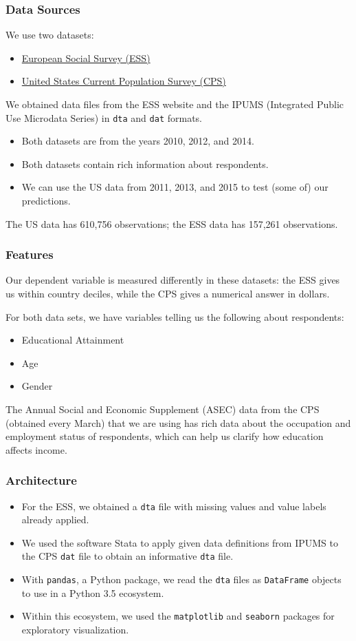 \documentclass{beamer}
\let\olditem=\item
\renewcommand{\item}{\olditem \justifying}
\begin{document}
\frame %
{
  \frametitle{Data Sources}
  We use two datasets:
  \begin{itemize} 
  \item \href{http://www.europeansocialsurvey.org/}{European Social Survey (ESS)} 
  \item \href{https://cps.ipums.org/cps/index.shtml}{United States Current Population Survey (CPS)}
  \end{itemize}
  We obtained data files from the ESS website and the IPUMS (Integrated Public Use Microdata Series) in \texttt{dta} and \texttt{dat} formats.
  \begin{itemize}
  \item Both datasets are from the years 2010, 2012, and 2014.
  \item Both datasets contain rich information about respondents.
  \item We can use the US data from 2011, 2013, and 2015 to test (some of) our predictions.
  \end{itemize}
  The US data has 610,756 observations; the ESS data has 157,261 observations.
}

\frame %
{
  \frametitle{Features}
Our dependent variable is measured differently in these datasets: the ESS gives us within country deciles, while the CPS gives a numerical answer in dollars.

For both data sets, we have variables telling us the following about respondents:
  \begin{itemize}
  \item Educational Attainment
  \item Age
  \item Gender
  \end{itemize}
  
  The Annual Social and Economic Supplement (ASEC) data from the CPS (obtained every March) that we are using has rich data about the occupation and employment status of respondents, which can help us clarify how education affects income.

}




\frame %
{
  \frametitle{Architecture}
  \begin{itemize}
  \item For the ESS, we obtained a \texttt{dta} file with missing values and value labels already applied.
  \item We used the software Stata to apply given data definitions from IPUMS to the CPS \texttt{dat} file to obtain an informative \texttt{dta} file.  
  \item With \texttt{pandas}, a Python package, we read the \texttt{dta} files as \texttt{DataFrame} objects to use in a Python 3.5 ecosystem.
  \item Within this ecosystem, we used the \texttt{matplotlib} and \texttt{seaborn} packages for exploratory visualization.
  \end{itemize}



  
}
\end{document}
